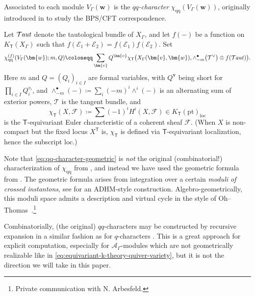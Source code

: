 \documentclass[pdftex]{sigma}%
\numberwithin{equation}{section}
\renewcommand{\vec}[1]{\bm{#1}}
\newcommand{\cE}{\mathcal{E}}
\newcommand{\cF}{\mathcal{F}}
\newcommand{\cT}{\mathcal{T}}
\newcommand{\kQ}{Q}
\newcommand{\sT}{\mathsf{T}}
\newcommand{\scA}{\mathscr{A}}
\newcommand{\pt}{\mathrm{pt}}
\newcommand{\loc}{\mathrm{loc}}
\newcommand{\chiqq}{\chi_{\mathrm{qq}}}
\DeclareMathOperator{\Taut}{\mathcal{T}\mkern-1.5mu{\mathit{aut}}}
\begin{document}
\begin{MyParagraph}
Associated to each module $V_\Gamma(\vec w)$ is the {\it $qq$-character}
$\chiqq(V_\Gamma(\vec w))$, originally introduced in \cite{Nekrasov2016} to
study the BPS/CFT correspondence.

\begin{Definition}
 Let $\Taut$ denote the tautological bundle of $X_\Gamma$, and let $f(-)$
 be a function on $K_\sT(X_\Gamma)$ such that $f(\cE_1 + \cE_2) = f(\cE_1)
 f(\cE_2)$. Set
 \begin{equation} \label{eq:qq-character-geometric}
 \chiqq^{(f)} (V_\Gamma(\vec w); m, \kQ ) \coloneqq \sum_{\vec v} \kQ^{\vec v} \chi_\sT\big(X_\Gamma(\vec v, \vec w), \wedge_{-m}^\bullet \big(\cT^\vee \big) \otimes f(\Taut)\big).
 \end{equation}
 Here $m$ and $\kQ = (\kQ_i)_{i \in I}$ are formal variables, with
 $\kQ^{\vec v}$ being short for $\prod_{i \in I} \kQ_i^{v_i}$, and
 $\wedge_{-m}^\bullet(-) \coloneqq \sum_i (-m)^i \wedge^i(-)$ is an
 alternating sum of exterior powers, $\cT$ is the tangent bundle, and
 \[ \chi_\sT(X, \cF) \coloneqq \sum (-1)^i H^i(X, \cF) \in K_\sT(\pt)_{\loc} \]
 is the $\sT$-equivariant Euler characteristic of a coherent sheaf
 $\cF$. (When $X$ is non-compact but the fixed locus $X^{\sT}$ is,
 $\chi_\sT$ is defined via $\sT$-equivariant localization, hence the
 subscript $\loc$.)
\end{Definition}
\end{MyParagraph}

\begin{MyParagraph}
Note that \eqref{eq:qq-character-geometric} is {\it not} the original
(combinatorial!) characterization of $\chiqq$ from \cite[Section~6.1]{Nekrasov2016}, and instead we have used the geometric formula
from \cite[Sections~8.3 and 8.4]{Nekrasov2016}. The geometric formula arises
from integration over a certain {\it moduli of crossed instantons},
see \cite{Nekrasov2017} for an ADHM-style construction.
Algebro-geometrically, this moduli space admits a description and
virtual cycle in the style of Oh--Thomas~\cite{Oh2020}.\footnote{Private communication with N. Arbesfeld.}

Combinatorially, (the original) $qq$-characters may be constructed by
recursive expansion \cite{Feigin2021} in a similar fashion as for
$q$-characters \cite{Frenkel2001}. This is a great approach for
explicit computation, especially for $\scA_\Gamma$-modules which are not
geometrically realizable like in
\eqref{eq:equivariant-k-theory-quiver-variety}, but it is not the
direction we will take in this paper.
\end{MyParagraph}
\end{document}
